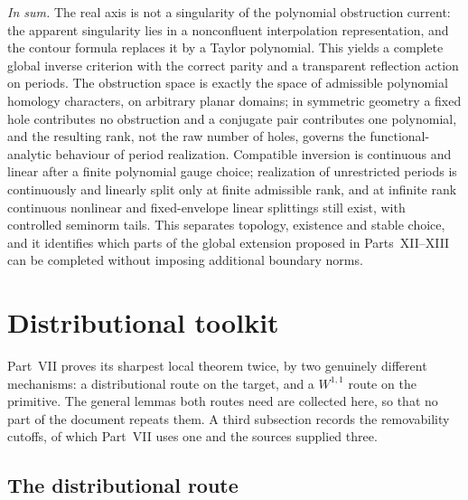 \documentclass[11pt,a4paper]{article}
\numberwithin{equation}{section}
\theoremstyle{definition}
\theoremstyle{remark}
\theoremstyle{plain}
\begin{document}
\emph{In sum.} The real axis is not a singularity of the polynomial obstruction
current: the apparent singularity lies in a nonconfluent interpolation
representation, and the contour formula replaces it by a Taylor polynomial.
This yields a complete global inverse criterion with the correct parity and a
transparent reflection action on periods. The obstruction space is exactly the
space of admissible polynomial homology characters, on arbitrary planar
domains; in symmetric geometry a fixed hole contributes no obstruction and a
conjugate pair contributes one polynomial, and the resulting rank, not the raw
number of holes, governs the functional-analytic behaviour of period
realization. Compatible inversion is continuous and linear after a finite
polynomial gauge choice; realization of unrestricted periods is continuously
and linearly split only at finite admissible rank, and at infinite rank
continuous nonlinear and fixed-envelope linear splittings still exist, with
controlled seminorm tails. This separates topology, existence and stable
choice, and it identifies which parts of the global extension proposed in
Parts~XII--XIII can be completed without imposing additional boundary norms.

\appendix

\section{Distributional toolkit}
\label{f:app:distributions}

Part~VII proves its sharpest local theorem twice, by two genuinely
different mechanisms: a distributional route on the target, and a
$W^{1,1}$ route on the primitive. The general lemmas both routes need are
collected here, so that no part of the document repeats them. A third
subsection records the removability cutoffs, of which Part~VII uses one and
the sources supplied three.

\subsection{The distributional route}
\label{f:sub:pointmass}
\end{document}
